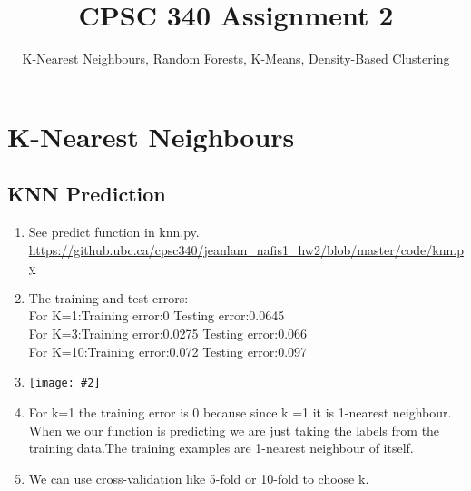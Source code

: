 \documentclass{article}
\begin{document}
\def\blu#1{{\color{blu}#1}}
\def\gre#1{{\color{gre}#1}}
\def\red#1{{\color{red}#1}}
\def\norm#1{\|#1\|}
\newcommand{\argmin}[1]{\mathop{\hbox{argmin}}_{#1}}
\newcommand{\argmax}[1]{\mathop{\hbox{argmax}}_{#1}}
\def\R{\mathbb{R}}
\newcommand{\fig}[2]{\texttt{[image: \#2]}}
\newcommand{\centerfig}[2]{\begin{center}\texttt{[image: \#2]}\end{center}}
\def\items#1{\begin{itemize}#1\end{itemize}}
\def\enum#1{\begin{enumerate}#1\end{enumerate}}
\def\answer#1{\iftoggle{answers}{\blu{Answer}:\\#1}}
\def\rubric#1{Rubric: \{#1\}}{}
\newcommand{\code}[1]{}


\title{CPSC 340 Assignment 2}
\author{K-Nearest Neighbours, Random Forests, K-Means, Density-Based Clustering}
\date{}
\maketitle

\section{K-Nearest Neighbours}
\subsection{KNN Prediction}
\begin{enumerate}
\item See predict function in knn.py. \url{https://github.ubc.ca/cpsc340/jeanlam_nafis1_hw2/blob/master/code/knn.py}
\item The training and test errors:\\
For K=1:Training error:0 Testing error:0.0645\\
For K=3:Training error:0.0275 Testing error:0.066\\
For K=10:Training error:0.072 Testing error:0.097\\
\item \centerfig{.5}{../figs/{1.1}.png}
\item For k=1 the training error is 0 because since k =1 it is 1-nearest neighbour. When
we our function is predicting we are just taking the labels from the training data.The training
examples are 1-nearest neighbour of itself.
\item We can use cross-validation like 5-fold or 10-fold to choose k.
\end{enumerate}
\end{document}
